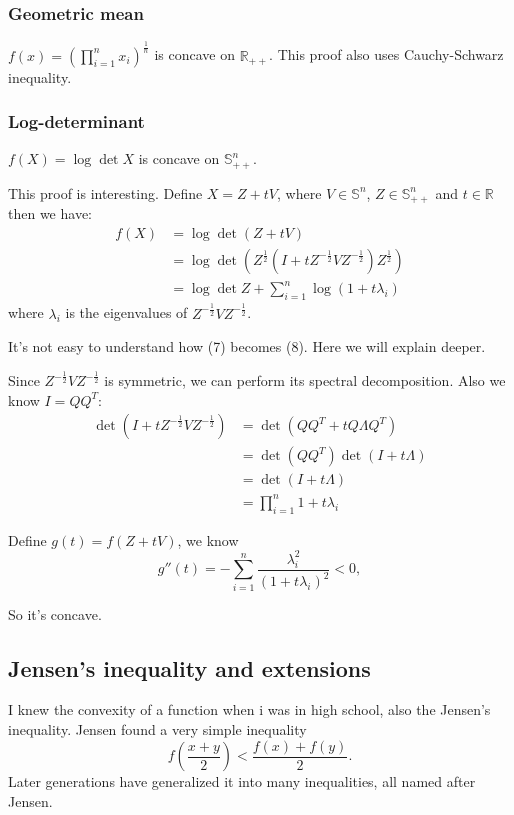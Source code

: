 \documentclass[lang=en,color=blue,mode=fancy,titlestyle=hang]{elegantbook}
\begin{document}
\subsubsection{Geometric mean} $f(x) = (\prod_{i = 1}^n x_i)^{\frac{1}{n}}$ is concave on
$\mathbb{R}_{++}$. This proof also uses Cauchy-Schwarz inequality.

\subsubsection{Log-determinant} $f(X) = \log \det X$ is concave on $\mathbb{S}^n_{++}$.

This proof is interesting. Define $X = Z + tV$, where $V \in \mathbb{S}^n$,
$Z \in \mathbb{S}^n_{++}$ and $t \in \mathbb{R}$ then we have:
\begin{align}
f(X) &= \log \det (Z + tV) \\
&= \log \det (Z^{\frac12}(I + tZ^{-\frac12}VZ^{-\frac12})Z^{\frac12}) \\
&= \log \det Z + \sum_{i = 1}^{n} \log (1 + t \lambda_i)
\end{align}
where $\lambda_i$ is the eigenvalues of $Z^{-\frac12}VZ^{-\frac12}$.

It's not easy to understand how (7) becomes (8). Here we will explain deeper.

Since $Z^{-\frac12}VZ^{-\frac12}$ is symmetric, we can perform its spectral decomposition.
Also we know $I = QQ^T$:
\begin{align*}
\det (I + tZ^{-\frac12}VZ^{-\frac12}) &= \det (QQ^T + tQ \Lambda Q^T) \\
&= \det (QQ^T) \det (I + t\Lambda) \\
&= \det (I + t\Lambda) \\
&= \prod_{i = 1}^n 1 + t\lambda_i
\end{align*}

Define $g(t) = f(Z + tV)$, we know
\[
g''(t) = - \sum_{i = 1}^n \frac{\lambda_i^2}{(1 + t\lambda_i)^2} < 0,
\]

So it's concave.

\subsection{Jensen's inequality and extensions}

I knew the convexity of a function when i was in high school, also the Jensen's inequality.
Jensen found a very simple inequality
\[
f(\frac{x + y}{2}) < \frac{f(x) + f(y)}{2}.
\]
Later generations have generalized it into many inequalities, all named after Jensen.
\end{document}
